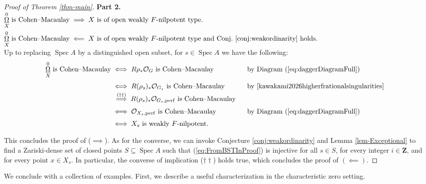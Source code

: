 \documentclass[letterpaper,11pt]{amsart}
\DeclareMathOperator{\DDB}{\underline{\Omega}}
\theoremstyle{plain}
\theoremstyle{definition}
\theoremstyle{remark}
\def\Z{{\mathbf Z}}
\def\cO{\mathcal{O}}
\DeclareMathOperator{\Spec} {Spec}
\begin{document}
\begin{proof}[Proof of Theorem \ref{thm-main}]
\noindent \textbf{Part 2.} $\begin{aligned}[t] \text{$\DDB^0_X$  is Cohen--Macaulay}  &\implies \text{$X$ is of open weakly $F$-nilpotent type.} \\ \text{$\DDB^0_X$  is Cohen--Macaulay} &\impliedby  \text{$X$ is of open weakly $F$-nilpotent type and Conj.\  \ref{conj:weakordinarity} holds.} \end{aligned}$\\[0.3em]

Up to replacing $\Spec A$ by a distinguished open subset, for $s \in \Spec A$ we have the following:\\[-1em] 
\begin{alignat*}{3}
\text{$\DDB^0_X$ is Cohen--Macaulay} &\iff \text{$R\rho_*\cO_{G}$ is Cohen--Macaulay}  \ &&\text{ by Diagram (\ref{eq:daggerDiagramFull})}  \\[0.3em]
&\iff \text{$R(\rho_s)_*\cO_{G_s}$ is Cohen--Macaulay}  \ &&\text{ by \cite[Proposition 2.11]{kawakami2026higherfrationalsingularities}} \\[-0.2em]
&\,\overset{{\footnotesize (\dagger\dagger)}}{\implies} \text{$R(\rho_s)_*\cO_{G_s, {\rm perf}}$ is Cohen--Macaulay}  \ && \\[0.35em]
&\iff \text{$\cO_{X_s, {\rm perf}}$ is Cohen--Macaulay} \ &&\text{ by Diagram (\ref{eq:daggerDiagramFull})} \\[0.3em]
&\iff \text{$X_s$ is weakly $F$-nilpotent.} \ &&
\end{alignat*}

This concludes the proof of ($\implies$). As for the converse, we can invoke Conjecture  \ref{conj:weakordinarity} and Lemma \ref{lem-Exceptional} to find a Zariski-dense set of closed points $S \subseteq \Spec A$ such that (\ref{eq:FromBSTInProof}) 
is injective for all $s \in S$, for every integer $i \in \Z$, and for every point $x \in X_s$. In particular, the converse of implication ($\dagger\dagger$) holds true, which concludes the proof of $(\impliedby)$.
\end{proof}

We conclude with a collection of examples. First, we describe a useful characterization in the characteristic zero setting.
\end{document}
